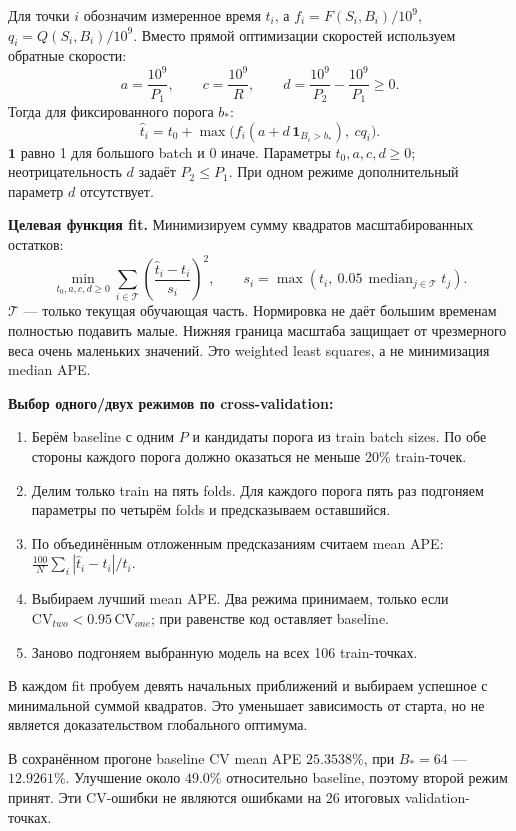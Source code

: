\documentclass[11pt,a4paper]{article}
\begin{document}
Для точки $i$ обозначим измеренное время $t_i$, а
$f_i=F(S_i,B_i)/10^9$, $q_i=Q(S_i,B_i)/10^9$.
Вместо прямой оптимизации скоростей используем обратные скорости:
\[
 a=\frac{10^9}{P_1},\qquad c=\frac{10^9}{R},\qquad
 d=\frac{10^9}{P_2}-\frac{10^9}{P_1}\ge0.
\]
Тогда для фиксированного порога $b_*$:
\[
 \widehat t_i=t_0+\max\bigl(f_i(a+d\,\mathbf1_{B_i>b_*}),\ c q_i\bigr).
\]
$\mathbf1$ равно 1 для большого batch и 0 иначе. Параметры
$t_0,a,c,d\ge0$; неотрицательность $d$ задаёт $P_2\le P_1$.
При одном режиме дополнительный параметр $d$ отсутствует.

\textbf{Целевая функция fit.} Минимизируем сумму квадратов масштабированных
остатков:
\[
 \min_{t_0,a,c,d\ge0}\sum_{i\in\mathcal T}
 \left(\frac{\widehat t_i-t_i}{s_i}\right)^2,\qquad
 s_i=\max\left(t_i,\ 0.05\,\operatorname{median}_{j\in\mathcal T} t_j\right).
\]
$\mathcal T$ --- только текущая обучающая часть. Нормировка не даёт большим
временам полностью подавить малые. Нижняя граница масштаба защищает от
чрезмерного веса очень маленьких значений. Это weighted least squares,
а не минимизация median APE.

\textbf{Выбор одного/двух режимов по cross-validation:}
\begin{enumerate}
\item Берём baseline с одним $P$ и кандидаты порога из train batch sizes.
По обе стороны каждого порога должно оказаться не меньше 20\% train-точек.
\item Делим только train на пять folds. Для каждого порога пять раз
подгоняем параметры по четырём folds и предсказываем оставшийся.
\item По объединённым отложенным предсказаниям считаем mean APE:
$\frac{100}{N}\sum_i|\widehat t_i-t_i|/t_i$.
\item Выбираем лучший mean APE. Два режима принимаем, только если
$\mathrm{CV}_{two}<0.95\,\mathrm{CV}_{one}$; при равенстве код оставляет baseline.
\item Заново подгоняем выбранную модель на всех 106 train-точках.
\end{enumerate}
В каждом fit пробуем девять начальных приближений и выбираем успешное
с минимальной суммой квадратов. Это уменьшает зависимость от старта,
но не является доказательством глобального оптимума.

В сохранённом прогоне baseline CV mean APE $25.3538\%$, при $B_*=64$
--- $12.9261\%$. Улучшение около $49.0\%$ относительно baseline,
поэтому второй режим принят. Эти CV-ошибки не являются ошибками на
26 итоговых validation-точках.
\end{document}
